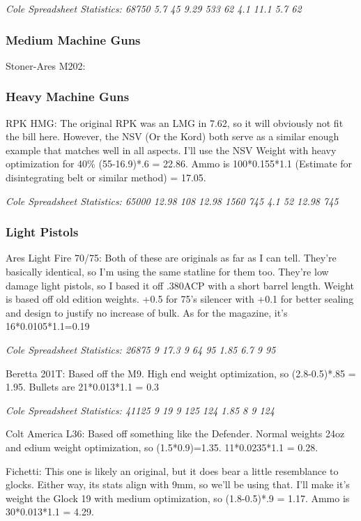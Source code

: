 \begin{multicols*}{2}
	\textit{\textcolor{OliveGreen}{Cole Spreadsheet Statistics: 68750 5.7 45 9.29 533 62 4.1 11.1 5.7 62}}
	
	\subsubsection{Medium Machine Guns}
	
	Stoner-Ares M202:
	
	\subsubsection{Heavy Machine Guns}
	
	RPK HMG: The original RPK was an LMG in 7.62, so it will obviously not fit the bill here. However, the NSV (Or the Kord) both serve as a similar enough example that matches well in all aspects. I'll use the NSV Weight with heavy optimization for 40\% (55-16.9)*.6 = 22.86. Ammo is  100*0.155*1.1 (Estimate for disintegrating belt or similar method) = 17.05.
	
	\textit{\textcolor{OliveGreen}{Cole Spreadsheet Statistics: 65000 12.98 108 12.98 1560 745 4.1 52 12.98 745}}
	
	\subsubsection{Light Pistols}
	
	Ares Light Fire 70/75: Both of these are originals as far as I can tell. They're basically identical, so I'm using the same statline for them too. They're low damage light pistols, so I based it off .380ACP with a short barrel length. Weight is based off old edition weights.  +0.5 for 75's silencer with +0.1 for better sealing and design to justify no increase of bulk. As for the magazine, it's 16*0.0105*1.1=0.19
	
	\textit{\textcolor{OliveGreen}{Cole Spreadsheet Statistics: 26875 9 17.3 9 64 95 1.85 6.7 9 95}}
	
	Beretta 201T: Based off the M9. High end weight optimization, so (2.8-0.5)*.85 = 1.95. Bullets are 21*0.013*1.1 = 0.3
	
	\textit{\textcolor{OliveGreen}{Cole Spreadsheet Statistics: 41125 9 19 9 125 124 1.85 8 9 124}}
	
	Colt America L36: Based off something like the Defender. Normal weights 24oz and edium weight optimization, so (1.5*0.9)=1.35. 11*0.0235*1.1 = 0.28.
	
	Fichetti: This one is likely an original, but it does bear a little resemblance to glocks. Either way, its stats align with 9mm, so we'll be using that. I'll make it's weight the Glock 19 with medium optimization, so (1.8-0.5)*.9 = 1.17. Ammo is 30*0.013*1.1 = 4.29.
	

\end{multicols*}
